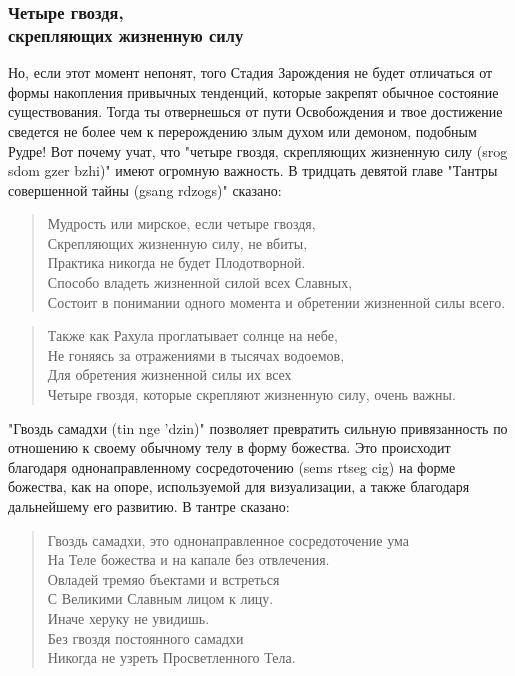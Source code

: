 \subsubsection{Четыре гвоздя, \\скрепляющих жизненную силу}
Но, если этот момент непонят, того Стадия Зарождения не будет отличаться от
формы накопления привычных тенденций, которые закрепят обычное состояние
существования. Тогда ты отвернешься от пути Освобождения и твое достижение сведется не
более чем к перерождению злым духом или демоном, подобным Рудре! Вот почему учат, что
"четыре гвоздя, скрепляющих жизненную силу (srog sdom gzer bzhi)" имеют огромную
важность. В тридцать девятой главе "Тантры совершенной тайны (gsang rdzogs)" сказано:
\\
\begin{verse}
Мудрость или мирское, если четыре гвоздя,\\
Скрепляющих жизненную силу, не вбиты,\\
Практика никогда не будет Плодотворной.\\
Способо владеть жизненной силой всех Славных,\\
Состоит в понимании одного момента и обретении жизненной силы всего.\\
\end{verse}

\begin{verse}
Также как Рахула проглатывает солнце на небе,\\
Не гоняясь за отражениями в тысячах водоемов,\\
Для обретения жизненной силы их всех\\
Четыре гвоздя, которые скрепляют жизненную силу, очень важны.
\end{verse}

"Гвоздь самадхи (tin nge 'dzin)" позволяет превратить сильную привязанность по
отношению к своему обычному телу в форму божества. Это происходит благодаря
однонаправленному сосредоточению (sems rtseg cig) на форме божества, как на опоре,
используемой для визуализации, а также благодаря дальнейшему его развитию. В тантре
сказано:

\begin{verse}
Гвоздь самадхи, это однонаправленное сосредоточение ума\\
На Теле божества и на капале без отвлечения.\\
Овладей тремяо бъектами и встреться\\
С Великими Славным лицом к лицу.\\
Иначе херуку не увидишь.\\
Без гвоздя постоянного самадхи\\
Никогда не узреть Просветленного Тела.
\end{verse}

